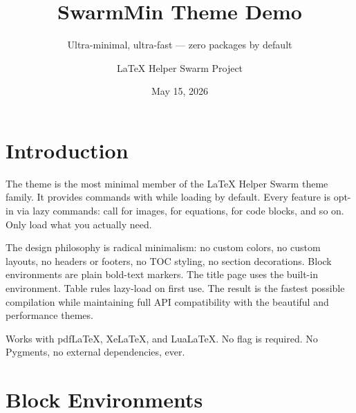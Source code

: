 \documentclass[11pt, a4paper]{article}
\title{SwarmMin Theme Demo}
\subtitle{Ultra-minimal, ultra-fast --- zero packages by default}
\author{LaTeX Helper Swarm Project}
\date{May 15, 2026}
\begin{document}

\swarmtitlepage


\tableofcontents
\newpage


\section{Introduction}

The  theme is the most minimal member of the LaTeX Helper Swarm
theme family. It provides  commands with
 while loading  by default. Every
feature is opt-in via lazy  commands: call
 for images, 
for equations,  for code blocks, and so on.
Only load what you actually need.

The design philosophy is radical minimalism: no custom colors, no custom
layouts, no headers or footers, no TOC styling, no section decorations. Block
environments are plain bold-text markers. The title page uses the built-in
 environment. Table rules lazy-load  on first
use. The result is the fastest possible compilation while maintaining full API
compatibility with the beautiful and performance themes.

\begin{tipblock}
  Works with pdfLaTeX, XeLaTeX, and LuaLaTeX. No 
  flag is required. No Pygments, no external dependencies, ever.
\end{tipblock}


\section{Block Environments}
\end{document}
